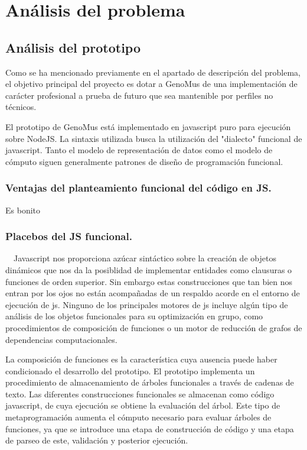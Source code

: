 \chapter{Análisis del problema}

\section{Análisis del prototipo}
 
Como se ha mencionado previamente en el apartado de descripción del problema, el objetivo principal del proyecto es dotar a GenoMus de una implementación de carácter profesional a prueba de futuro que sea mantenible por perfiles no técnicos.

El prototipo de GenoMus está implementado en javascript puro para ejecución sobre NodeJS. La sintaxis utilizada busca la utilización del "dialecto" funcional de javascript. Tanto el modelo de representación de datos como el modelo de cómputo siguen generalmente patrones de diseño de programación funcional. 

\subsection{Ventajas del planteamiento funcional del código en JS.}
Es bonito

\subsection{Placebos del JS funcional.} \ \
Javascript nos proporciona azúcar sintáctico sobre la creación de objetos dinámicos que nos da la posiblidad de implementar entidades como clausuras o funciones de orden superior. Sin embargo estas construcciones que tan bien nos entran por los ojos no están acompañadas de un respaldo acorde en el entorno de ejecución de js. Ninguno de los principales motores de js incluye algún tipo de análisis de los objetos funcionales para su optimización en grupo, como procedimientos de composición de funciones o un motor de reducción de grafos de dependencias computacionales.

La composición de funciones es la característica cuya ausencia puede haber condicionado el desarrollo del prototipo. El prototipo implementa un procedimiento de almacenamiento de árboles funcionales a través de cadenas de texto. Las diferentes construcciones funcionales se almacenan como código javascript, de cuya ejecución se obtiene la evaluación del árbol. Este tipo de metaprogramación aumenta el cómputo necesario para evaluar árboles de funciones, ya que se introduce una etapa de construcción de código y una etapa de parseo de este, validación y posterior ejecución.
